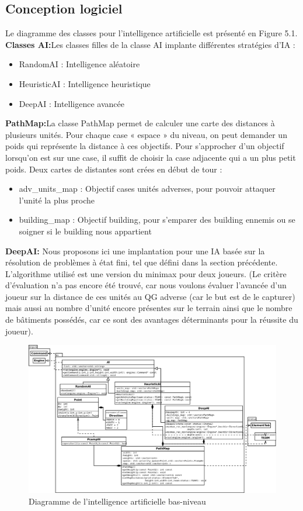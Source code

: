 \documentclass[12pt]{report}
\begin{document}
\begin{itemize}
\section{Conception logiciel}
\paragraphe{}Le diagramme des classes pour l’intelligence artificielle est présenté en Figure 5.1.
\paragraphe{}\textbf{Classes AI:}Les classes filles de la classe AI implante différentes stratégies d’IA :
\begin{itemize}
    \item RandomAI : Intelligence aléatoire
    \item HeuristicAI : Intelligence heuristique
     \item DeepAI : Intelligence avancée
\end{itemize}
\paragraphe{}\textbf{PathMap:}La classe PathMap permet de calculer une carte des distances à plusieurs unités. Pour chaque case « espace » du niveau, on peut demander un poids qui représente la distance à ces objectifs. Pour s’approcher d’un objectif lorsqu’on est sur une case, il suffit de choisir la case
adjacente qui a un plus petit poids. Deux cartes de distantes
sont crées en début de tour :
\begin{itemize}
    \item adv\_units\_map : Objectif cases unités adverses, pour pouvoir attaquer l'unité la plus proche
    \item building\_map : Objectif building, pour s’emparer des building ennemis ou se soigner si le building nous appartient
\end{itemize}

\paragraphe{}\textbf{DeepAI:} Nous proposons ici une implantation pour une IA basée sur la résolution de problèmes à état ﬁni, tel que déﬁni dans la section précédente. L’algorithme utilisé est une version du minimax pour deux joueurs. 
\newline (Le critère d'évaluation n'a pas encore été trouvé, car nous voulons évaluer l'avancée d'un joueur sur la distance de ces unités au QG adverse (car le but est de le capturer) mais aussi au nombre d'unité encore présentes sur le terrain ainsi que le nombre de bâtiments possédés, car ce sont des avantages déterminants pour la réussite du joueur).
\end{itemize}

    \newpage
\thispagestyle{empty}
\begin{landscape}
\begin{figure}[h]
    \begin{center}
    \includegraphics[scale=0.45]{ai.png}
    \end{center}
    \caption{Diagramme de l'intelligence artificielle bas-niveau}
\end{figure}
\end{landscape}
\end{document}
